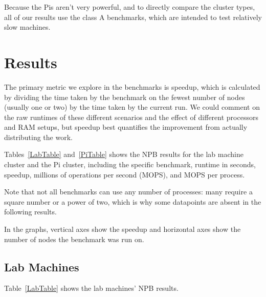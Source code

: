 \documentclass{acm_proc_article-sp}
\begin{document}
Because the Pis aren't very powerful, and to directly compare the cluster types, all of our results use the class A benchmarks, which are intended to test relatively slow machines.

\section{Results}
The primary metric we explore in the benchmarks is speedup, which is calculated by dividing the time taken by the benchmark on the fewest number of nodes (usually one or two) by the time taken by the current run. We could comment on the raw runtimes of these different scenarios and the effect of different processors and RAM setups, but speedup best quantifies the improvement from actually distributing the work.

Tables~\ref{LabTable} and~\ref{PiTable} shows the NPB results for the lab machine cluster and the Pi cluster, including the specific benchmark, runtime in seconds, speedup, millions of operations per second (MOPS), and MOPS per process.

Note that not all benchmarks can use any number of processes: many require a square number or a power of two, which  is why some datapoints are absent in the following results.

In the graphs, vertical axes show the speedup and horizontal axes show the number of nodes the benchmark was run on.

\subsection{Lab Machines}

Table~\ref{LabTable} shows the lab machines' NPB results.
\end{document}
